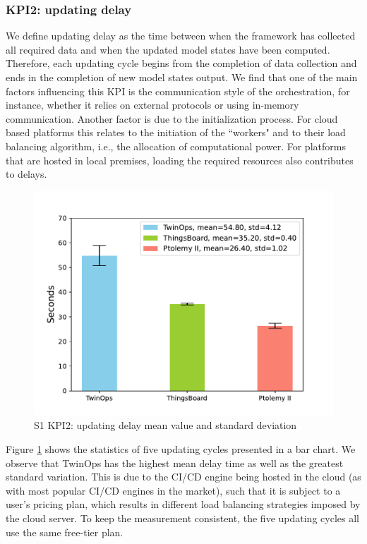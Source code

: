 \subsubsection{KPI2: updating delay}
We define updating delay as the time between when the framework has collected all required data and when the updated model states have been computed. Therefore, each updating cycle begins from the completion of data collection and ends in the completion of new model states output. We find that one of the main factors influencing this KPI is the communication style of the orchestration, for instance, whether it relies on external protocols or using in-memory communication. Another factor is due to the initialization process. For cloud based platforms this relates to the initiation of the ``workers" and to their load balancing algorithm, i.e., the allocation of computational power. For platforms that are hosted in local premises, loading the required resources also contributes to delays.

\begin{figure}[hbt!]
  \centering
  \includegraphics[scale=0.5]{figures/s1kpi2.pdf}
  \caption[S1 KPI2: updating delay]{S1 KPI2: updating delay mean value and standard deviation}
  \label{fig:s1kpi2}
\end{figure}

Figure \ref{fig:s1kpi2} shows the statistics of five updating cycles presented in a bar chart. We observe that TwinOps has the highest mean delay time as well as the greatest standard variation. This is due to the CI/CD engine being hosted in the cloud (as with most popular CI/CD engines in the market), such that it is subject to a user's pricing plan, which results in different load balancing strategies imposed by the cloud server. To keep the measurement consistent, the five updating cycles all use the same free-tier plan.

